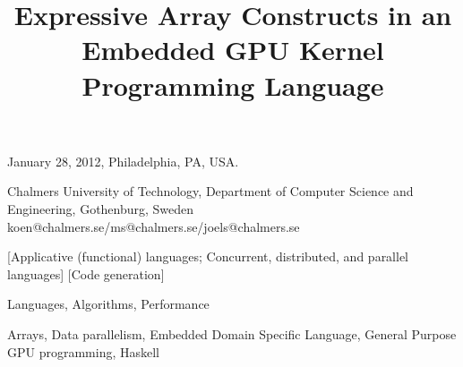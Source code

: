\documentclass[]{sigplanconf}
\begin{document}
 {January 28, 2012, Philadelphia, PA, USA.}


\titlebanner{}        %
\preprintfooter{}   %

\title{Expressive Array Constructs in an Embedded GPU Kernel Programming Language}

           {Chalmers University of Technology, 
             Department of Computer Science and Engineering,
             Gothenburg, Sweden}
           {koen@chalmers.se/ms@chalmers.se/joels@chalmers.se}

\maketitle




[Applicative (functional) languages; Concurrent, distributed, and parallel languages]
[Code generation]



\terms
Languages, Algorithms, Performance

\keywords
Arrays, Data parallelism, Embedded Domain Specific Language, General Purpose GPU programming, Haskell



 





\appendix
\end{document}

